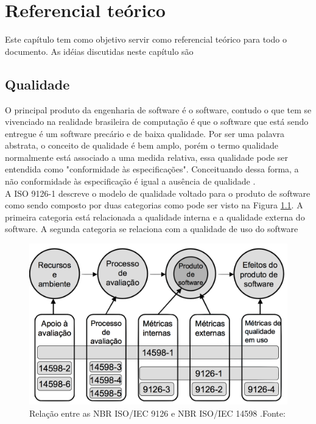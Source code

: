
\chapter[Referencial Teórico]{Referencial teórico}
	
	Este capítulo tem como objetivo servir como referencial teórico para todo o documento. As idéias discutidas neste capítulo são
	
\section{Qualidade}
	O principal produto da engenharia de software é o software, contudo o que tem se vivenciado na realidade brasileira de computação é que o software que está sendo entregue é um software precário e de baixa qualidade. Por ser uma palavra abstrata, o conceito de qualidade é bem amplo, porém o termo qualidade normalmente está associado a uma medida relativa, essa qualidade pode ser entendida como "conformidade às especificações". Conceituando dessa forma, a não conformidade às especificação é igual a ausência de qualidade \cite{Paduelli}.
\\ A ISO 9126-1 descreve o modelo de qualidade voltado para o produto de software como sendo composto por duas categorias como pode ser visto na Figura \ref{img:relacao_iso}. A primeira categoria está relacionada a qualidade interna e a qualidade externa do software. A segunda categoria se relaciona com a qualidade de uso do software \cite{_nbr_2016}
\graphicspath{{figuras/}}
\begin{figure}
\centering
\includegraphics[scale=0.40]{ISO}
\caption{Relação entre as NBR ISO/IEC 9126 e NBR ISO/IEC 14598 .Fonte:\cite{_nbr_2016}}
\label{img:relacao_iso}
\end{figure}

